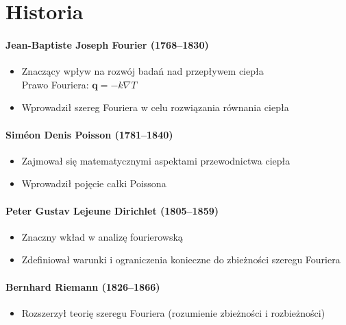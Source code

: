 \documentclass[polish, titlepage, 12pt]{article}
\begin{document}
\section*{Historia}

\paragraph{Jean-Baptiste Joseph Fourier (1768--1830)}
\begin{itemize}
    \item Znaczący wpływ na rozwój badań nad przepływem ciepła \\
          Prawo Fouriera: \( \symbf{q} = -k \nabla T \)
    \item Wprowadził szereg Fouriera w celu rozwiązania równania ciepła
\end{itemize}

\paragraph{Siméon Denis Poisson (1781--1840)}
\begin{itemize}
    \item Zajmował się matematycznymi aspektami przewodnictwa ciepła
    \item Wprowadził pojęcie całki Poissona
\end{itemize}

\paragraph{Peter Gustav Lejeune Dirichlet (1805--1859)}
\begin{itemize}
    \item Znaczny wkład w analizę fourierowską
    \item Zdefiniował warunki i ograniczenia konieczne do zbieżności szeregu Fouriera
\end{itemize}

\paragraph{Bernhard Riemann (1826--1866)}
\begin{itemize}
    \item Rozszerzył teorię szeregu Fouriera (rozumienie zbieżności i rozbieżności)
\end{itemize}
\end{document}
